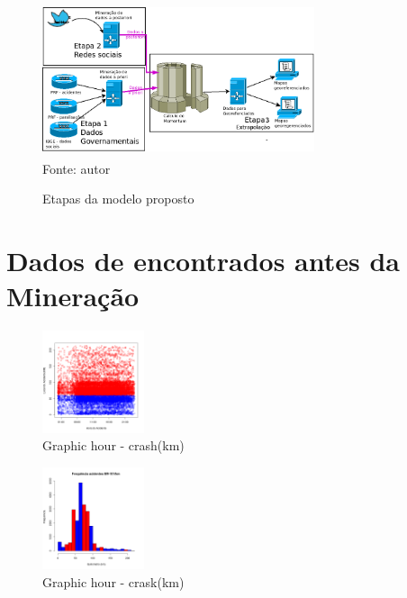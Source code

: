 \documentclass[conference,compsoc]{IEEEtran}
\begin{document}
\begin{figure}[ht]
\centering
\caption{Etapas da modelo proposto}
\includegraphics[width=80mm, height=45mm]{Figuras/metodologiaGeral.png}\\
\tiny Fonte: autor
\end{figure}


\section{Dados de encontrados antes da Mineração}

\begin{figure}[ht]
\begin{center}
\includegraphics[height=3.0cm]{graficos/br101_1.png}
\caption{Graphic hour - crash(km)}
\end{center}
\end{figure}


\begin{figure}[ht]
\begin{center}
\includegraphics[height=3.0cm]{graficos/br101_2.png}
\caption{Graphic hour - crask(km)}
\end{center}
\end{figure}
\end{document}
